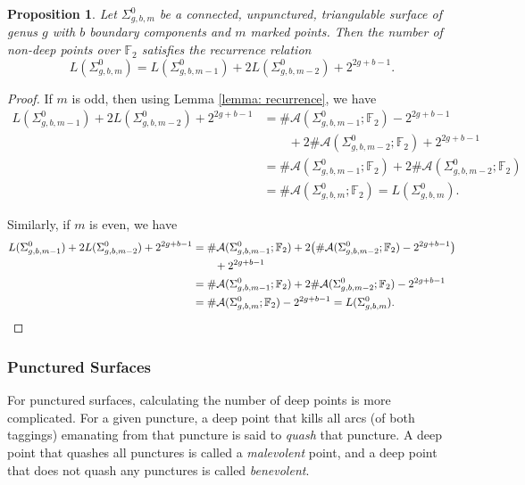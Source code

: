 \documentclass[reqno,12pt]{amsart}
\newtheorem{prop}[thm]{Proposition}
\theoremstyle{definition}
\theoremstyle{remark}
\theoremstyle{remark}
\numberwithin{equation}{section}
\begin{document}
\begin{prop}\label{prop: unpunc recursion}
    Let $\Sigma_{g,b,m}^0$ be a connected, unpunctured, triangulable surface of genus $g$ with $b$ boundary components and $m$ marked points. 
	Then the number of non-deep points over $\mathbb{F}_2$ satisfies the recurrence relation 
	\[ L(\Sigma_{g,b,m}^0) = L(\Sigma_{g,b,m-1}^0) + 2 L(\Sigma_{g,b,m-2}^0) + 2^{2g+b-1}. \]
\end{prop}
\begin{proof}
	If $m$ is odd, then using Lemma \ref{lemma: recurrence}, we have 
\begin{align*}
	L(\Sigma_{g,b,m-1}^0) + 2 L(\Sigma_{g,b,m-2}^0) + 2^{2g+b-1} &= \#\mathcal{A}(\Sigma_{g,b,m-1}^0; \mathbb{F}_2) - 2^{2g+b-1} \\ &\quad\quad + 2\#\mathcal{A}(\Sigma_{g,b,m-2}^0; \mathbb{F}_2) + 2^{2g+b-1} \\
	&= \#\mathcal{A}(\Sigma_{g,b,m-1}^0; \mathbb{F}_2) + 2 \#\mathcal{A}(\Sigma_{g,b,m-2}^0; \mathbb{F}_2) \\
	&= \#\mathcal{A}(\Sigma_{g,b,m}^0; \mathbb{F}_2) = L(\Sigma_{g,b,m}^0).
\end{align*}

	Similarly, if $m$ is even, we have 
\begin{align*}
	L(\Sigma_{g,b,m-1}^0) + 2 L(\Sigma_{g,b,m-2}^0) + 2^{2g+b-1} &= \#\mathcal{A}(\Sigma_{g,b,m-1}^0; \mathbb{F}_2) + 2\big(\#\mathcal{A}(\Sigma_{g,b,m-2}^0; \mathbb{F}_2) - 2^{2g+b-1}\big) \\ &\quad\quad + 2^{2g+b-1} \\
	&= \#\mathcal{A}(\Sigma_{g,b,m-1}^0; \mathbb{F}_2) + 2\#\mathcal{A}(\Sigma_{g,b,m-2}^0; \mathbb{F}_2) - 2^{2g+b-1} \\
	&= \#\mathcal{A}(\Sigma_{g,b,m}^0; \mathbb{F}_2) - 2^{2g+b-1} = L(\Sigma_{g,b,m}^0).\qedhere
\end{align*}
\end{proof}

\subsubsection{Punctured Surfaces}

For punctured surfaces, calculating the number of deep points is more complicated. For a given puncture, a deep point that kills all arcs (of both taggings) emanating from that puncture is said to \emph{quash} that puncture. A deep point that quashes all punctures is called a \emph{malevolent} point, and a deep point that does not quash any punctures is called \emph{benevolent}. 
\end{document}
